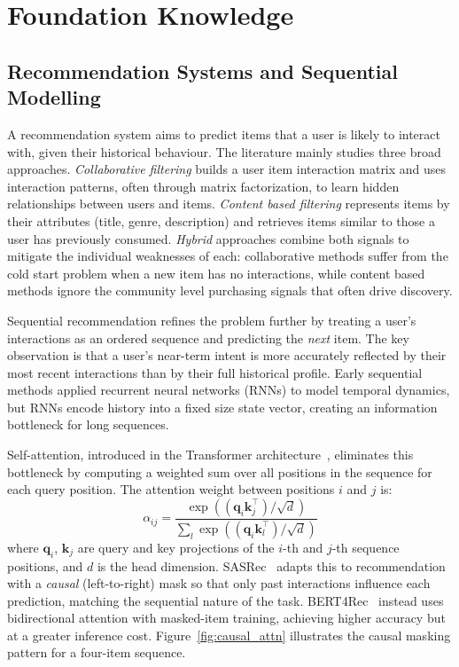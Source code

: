 \section{Foundation Knowledge}
\label{sec:foundation}

\subsection{Recommendation Systems and Sequential Modelling}
\label{sec:seq_rec}

A recommendation system aims to predict items that a user is likely to interact with, given their historical behaviour.
The literature mainly studies three broad approaches.
\textit{Collaborative filtering} builds a user item interaction matrix and uses interaction patterns, often through matrix factorization, to learn hidden relationships between users and items.
\textit{Content based filtering} represents items by their attributes (title, genre, description) and retrieves items similar to those a user has previously consumed.
\textit{Hybrid} approaches combine both signals to mitigate the individual weaknesses of each: collaborative methods suffer from the cold start problem when a new item has no interactions, while content based methods ignore the community level purchasing signals that often drive discovery.

Sequential recommendation refines the problem further by treating a user's interactions as an ordered sequence and predicting the \textit{next} item.
The key observation is that a user's near-term intent is more accurately reflected by their most recent interactions than by their full historical profile.
Early sequential methods applied recurrent neural networks (RNNs) to model temporal dynamics, but RNNs encode history into a fixed size state vector, creating an information bottleneck for long sequences.

Self-attention, introduced in the Transformer architecture~\cite{vaswani2017attention}, eliminates this bottleneck by computing a weighted sum over all positions in the sequence for each query position.
The attention weight between positions $i$ and $j$ is:
\begin{equation}
  \alpha_{ij} = \frac{\exp((\mathbf{q}_i \mathbf{k}_j^\top) / \sqrt{d})}{\sum_{l} \exp((\mathbf{q}_i \mathbf{k}_l^\top) / \sqrt{d})}
\end{equation}
where $\mathbf{q}_i$, $\mathbf{k}_j$ are query and key projections of the $i$-th and $j$-th sequence positions, and $d$ is the head dimension.
SASRec~\cite{kang2018self} adapts this to recommendation with a \textit{causal} (left-to-right) mask so that only past interactions influence each prediction, matching the sequential nature of the task.
BERT4Rec~\cite{sun2019bert4rec} instead uses bidirectional attention with masked-item training, achieving higher accuracy but at a greater inference cost.
Figure~\ref{fig:causal_attn} illustrates the causal masking pattern for a four-item sequence.

